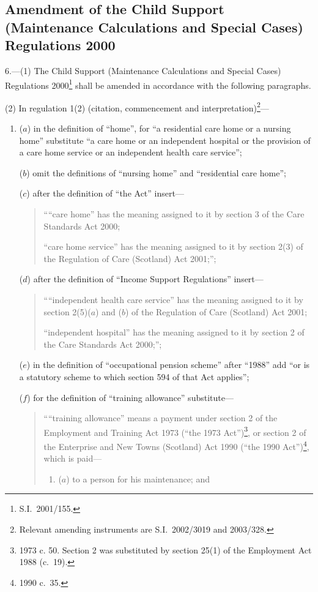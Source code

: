 \documentclass[12pt,a4paper]{article}
\begin{document}
\subsection[6. Amendment of the Child Support (Maintenance Calculations and Special Cases) Regulations 2000]{Amendment of the Child Support (Maintenance Calculations and Special Cases) Regulations 2000}

6.---(1)  The Child Support (Maintenance Calculations and Special Cases) Regulations 2000\footnote{S.I.\ 2001/155.} shall be amended in accordance with the following paragraphs.

(2) In regulation 1(2) (citation, commencement and interpretation)\footnote{Relevant amending instruments are S.I.\ 2002/3019 and 2003/328.}—
\begin{enumerate}\item[]
($a$) in the definition of “home”, for “a residential care home or a nursing home” substitute “a care home or an independent hospital or the provision of a care home service or an independent health care service”;

($b$) omit the definitions of “nursing home” and “residential care home”;

($c$) after the definition of “the Act” insert—
\begin{quotation}
““care home” has the meaning assigned to it by section 3 of the Care Standards Act 2000;

“care home service” has the meaning assigned to it by section 2(3) of the Regulation of Care (Scotland) Act 2001;”;
\end{quotation}

($d$) after the definition of “Income Support Regulations” insert—
\begin{quotation}
““independent health care service” has the meaning assigned to it by section 2(5)($a$)  and ($b$)  of the Regulation of Care (Scotland) Act 2001;

“independent hospital” has the meaning assigned to it by section 2 of the Care Standards Act 2000;”;
\end{quotation}

($e$) in the definition of “occupational pension scheme” after “1988” add “or is a statutory scheme to which section 594 of that Act applies”;

($f$) for the definition of “training allowance” substitute—
\begin{quotation}
““training allowance” means a payment under section 2 of the Employment and Training Act 1973 (“the 1973 Act”)\footnote{1973 c. 50. Section 2 was substituted by section 25(1) of the Employment Act 1988 (c.\ 19).}, or section 2 of the Enterprise and New Towns (Scotland) Act 1990 (“the 1990 Act”)\footnote{1990 c.\ 35.}, which is paid—
\begin{enumerate}\item[]
($a$) 
to a person for his maintenance; and


\end{enumerate}
\end{quotation}
\end{enumerate}
\end{document}
